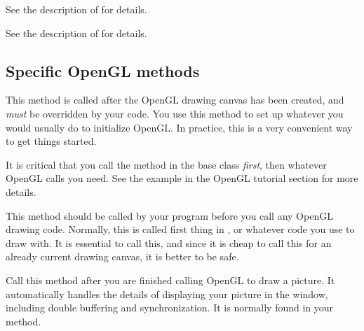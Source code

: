 
See the description of  for details.


See the description of  for details.

\subsection* {Specific OpenGL methods} %


This method is called after the OpenGL drawing canvas has
been created, and \emph{must} be overridden by your code.
You use this method to set up whatever you would usually do
to initialize OpenGL. In practice, this is a very convenient
way to get things started. 

It is critical that you call the  method
in the base  class \emph{first},
then whatever OpenGL calls you need.
See the example in the OpenGL tutorial section for more details.


This method should be called by your program before you
call any OpenGL drawing code. Normally, this is called
first thing in , or whatever code you use
to draw with. It is essential to call this, and since
it is cheap to call this for an already current drawing
canvas, it is better to be safe.


Call this method after you are finished calling OpenGL to
draw a picture. It automatically handles the details of
displaying your picture in the window, including double
buffering and synchronization. It is normally found in your
 method.
        

